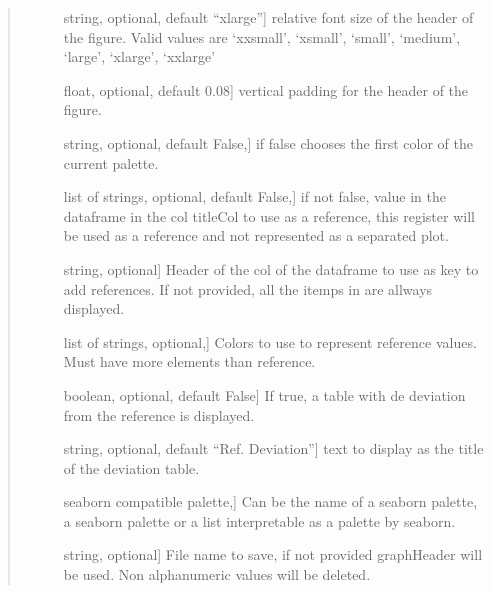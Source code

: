 \documentclass[letterpaper,10pt,english]{sphinxmanual}
\begin{document}
\begin{fulllineitems}
\begin{quote}
\begin{description}
\begin{description}
\item[{}] \leavevmode{[}string, optional, default “x\sphinxhyphen{}large”{]}
relative font size of the header of the figure. 
Valid values are  ‘xx\sphinxhyphen{}small’, ‘x\sphinxhyphen{}small’, ‘small’, 
‘medium’, ‘large’, ‘x\sphinxhyphen{}large’, ‘xx\sphinxhyphen{}large’

\item[{}] \leavevmode{[}float, optional, default 0.08{]}
vertical padding for the header of the figure.

\item[{}] \leavevmode{[}string, optional, default False,{]}
if false chooses the first color of the current palette.

\item[{}] \leavevmode{[}list of strings, optional, default False,{]}
if not false, value in the dataframe in 
the col titleCol to use as a reference, 
this register will be used as a reference 
and not represented as a separated plot.

\item[{}] \leavevmode{[}string, optional{]}
Header of the col of the dataframe 
to use as key to add references. 
If not provided, all the itemps in  are allways displayed.

\item[{}] \leavevmode{[}list of strings, optional,{]}
Colors to use to represent reference values. 
Must have more elements than reference.

\item[{}] \leavevmode{[}boolean, optional, default False{]}
If true, a table with de deviation 
from the reference is displayed.

\item[{}] \leavevmode{[}string, optional, default “Ref. Deviation”{]}
text to display as the title of the deviation table.

\item[{}] \leavevmode{[}seaborn compatible palette,{]}
Can be the name of a seaborn palette, 
a seaborn palette or a list 
interpretable as a palette by seaborn.

\item[{}] \leavevmode{[}string, optional{]}
File name to save, if not provided graphHeader will be used. 
Non alphanumeric values will be deleted.


\end{description}
\end{description}
\end{quote}
\end{fulllineitems}
\end{document}
